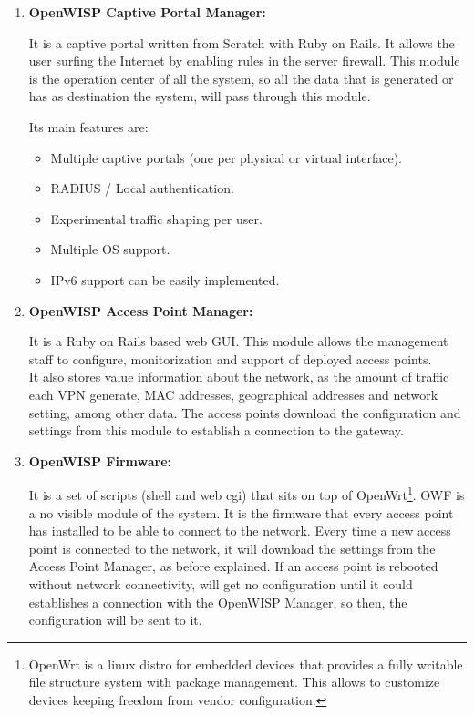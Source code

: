 \documentclass[draftclsnofoot,12pt,journal,onecolumn]{IEEEtran}
\begin{document}
\begin{enumerate}
\item[\fbox{3}]\textbf{OpenWISP Captive Portal Manager:}

It is a captive portal written from Scratch with Ruby on Rails. It allows the user surfing the Internet by enabling rules in the server firewall. This module is the operation center of all the system, so all the data that is generated or has as destination the system, will pass through this module. 

Its main features are:
\begin{itemize}
\item Multiple captive portals (one per physical or virtual interface).
\item RADIUS / Local authentication.
\item Experimental traffic shaping per user.
\item Multiple OS support.
\item IPv6 support can be easily implemented.
\end{itemize}


\item[\fbox{4}]\textbf{OpenWISP Access Point Manager:}

It is a Ruby on Rails based web GUI. This module allows the management staff to configure, monitorization and support of deployed access points.\\ It also stores value information about the network, as the amount of traffic each VPN generate, MAC addresses, geographical addresses and network setting, among other data. The access points download the configuration and settings from this module to establish a connection to the gateway.  


\item[\fbox{5}]\textbf{OpenWISP Firmware:}

It is a set of scripts (shell and web cgi) that sits on top of OpenWrt\footnote{OpenWrt is a linux distro for embedded devices that provides a fully writable file structure system with package management. This allows to customize devices keeping freedom from vendor configuration.}. OWF is a no visible module of the system. It is the firmware that every access point has installed to be able to connect to the network. Every time a new access point is connected to the network, it will download the settings from the Access Point Manager, as before explained. If an access point is rebooted without network connectivity, will get no configuration until it could establishes a connection with the OpenWISP Manager, so then, the configuration will be sent to it. 


\end{enumerate}
\end{document}
